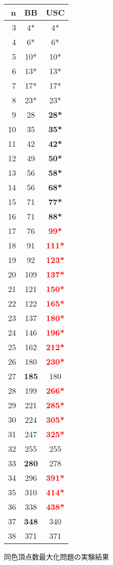 \begin{tabular}{r|c|c}
 \hline
 n&BB &USC\\
 \hline
 3&4*&4*\\
 4&6*&6*\\
 5&10*&10*\\
 6&13*&13*\\
 7&17*&17*\\
 8&23*&23*\\
 9&28&\textbf{28*}\\
 10&35&\textbf{35*}\\
 11&42&\textbf{42*}\\
 12&49&\textbf{50*}\\
 13&56&\textbf{58*}\\
 14&56&\textbf{68*}\\
 15&71&\textbf{77*}\\
 16&71&\textbf{88*}\\
 17&76&\textbf{\textcolor{red}{99*}}\\
 18&91&\textbf{\textcolor{red}{111*}}\\
 19&92&\textbf{\textcolor{red}{123*}}\\
 20&109&\textbf{\textcolor{red}{137*}}\\
 21&121&\textbf{\textcolor{red}{150*}}\\
 22&122&\textbf{\textcolor{red}{165*}}\\
 23&137&\textbf{\textcolor{red}{180*}}\\
 24&146&\textbf{\textcolor{red}{196*}}\\
 25&162&\textbf{\textcolor{red}{212*}}\\
 26&180&\textbf{\textcolor{red}{230*}}\\
 27&\textbf{185}&180\\
 28&199&\textbf{\textcolor{red}{266*}}\\
 29&221&\textbf{\textcolor{red}{285*}}\\
 30&224&\textbf{\textcolor{red}{305*}}\\
 31&247&\textbf{\textcolor{red}{325*}}\\
 32&255&255\\
 33&\textbf{280}&278\\
 34&296&\textbf{\textcolor{red}{391*}}\\
 35&310&\textbf{\textcolor{red}{414*}}\\
 36&338&\textbf{\textcolor{red}{438*}}\\
 37&\textbf{348}&340\\
 38&371&371\\
\end{tabular}
 \caption{同色頂点数最大化問題の実験結果}
 \label{table:max}
 